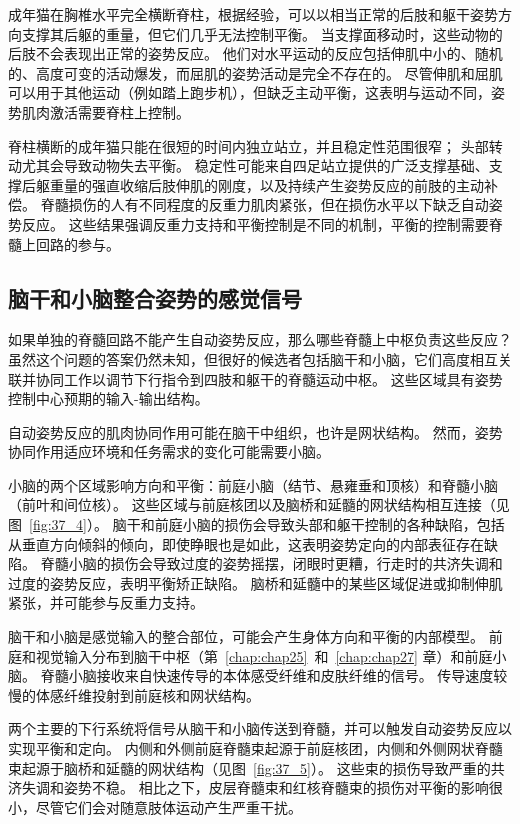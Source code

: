 成年猫在胸椎水平完全横断脊柱，根据经验，可以以相当正常的后肢和躯干姿势方向支撑其后躯的重量，但它们几乎无法控制平衡。
当支撑面移动时，这些动物的后肢不会表现出正常的姿势反应。
他们对水平运动的反应包括伸肌中小的、随机的、高度可变的活动爆发，而屈肌的姿势活动是完全不存在的。
尽管伸肌和屈肌可以用于其他运动（例如踏上跑步机），但缺乏主动平衡，这表明与运动不同，姿势肌肉激活需要脊柱上控制。


脊柱横断的成年猫只能在很短的时间内独立站立，并且稳定性范围很窄；
头部转动尤其会导致动物失去平衡。
稳定性可能来自四足站立提供的广泛支撑基础、支撑后躯重量的强直收缩后肢伸肌的刚度，以及持续产生姿势反应的前肢的主动补偿。
脊髓损伤的人有不同程度的反重力肌肉紧张，但在损伤水平以下缺乏自动姿势反应。
这些结果强调反重力支持和平衡控制是不同的机制，平衡的控制需要脊髓上回路的参与。



\subsection{脑干和小脑整合姿势的感觉信号}

如果单独的脊髓回路不能产生自动姿势反应，那么哪些脊髓上中枢负责这些反应？
虽然这个问题的答案仍然未知，但很好的候选者包括脑干和小脑，它们高度相互关联并协同工作以调节下行指令到四肢和躯干的脊髓运动中枢。
这些区域具有姿势控制中心预期的输入-输出结构。


自动姿势反应的肌肉协同作用可能在脑干中组织，也许是网状结构。
然而，姿势协同作用适应环境和任务需求的变化可能需要小脑。


小脑的两个区域影响方向和平衡：前庭小脑（结节、悬雍垂和顶核）和脊髓小脑（前叶和间位核）。
这些区域与前庭核团以及脑桥和延髓的网状结构相互连接（见图~\ref{fig:37_4}）。
脑干和前庭小脑的损伤会导致头部和躯干控制的各种缺陷，包括从垂直方向倾斜的倾向，即使睁眼也是如此，这表明姿势定向的内部表征存在缺陷。
脊髓小脑的损伤会导致过度的姿势摇摆，闭眼时更糟，行走时的共济失调和过度的姿势反应，表明平衡矫正缺陷。
脑桥和延髓中的某些区域促进或抑制伸肌紧张，并可能参与反重力支持。


脑干和小脑是感觉输入的整合部位，可能会产生身体方向和平衡的内部模型。
前庭和视觉输入分布到脑干中枢（第~\ref{chap:chap25}~和~\ref{chap:chap27} 章）和前庭小脑。
脊髓小脑接收来自快速传导的本体感受纤维和皮肤纤维的信号。
传导速度较慢的体感纤维投射到前庭核和网状结构。


两个主要的下行系统将信号从脑干和小脑传送到脊髓，并可以触发自动姿势反应以实现平衡和定向。
内侧和外侧前庭脊髓束起源于前庭核团，内侧和外侧网状脊髓束起源于脑桥和延髓的网状结构（见图~\ref{fig:37_5}）。
这些束的损伤导致严重的共济失调和姿势不稳。
相比之下，皮层脊髓束和红核脊髓束的损伤对平衡的影响很小，尽管它们会对随意肢体运动产生严重干扰。



